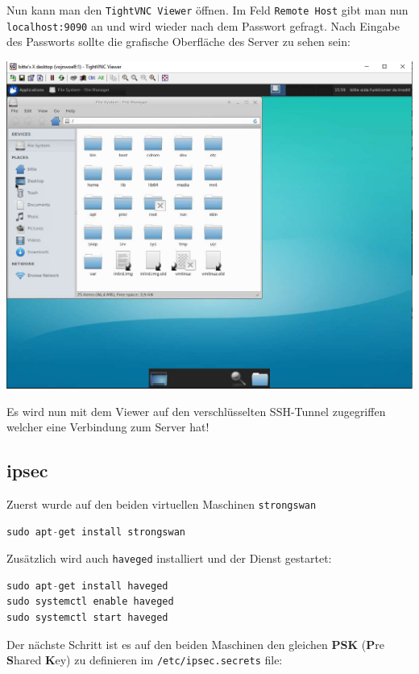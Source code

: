 Nun kann man den \verb|TightVNC Viewer| öffnen. Im Feld \verb|Remote Host| gibt man nun \verb|localhost:9090| an und wird wieder nach dem Passwort gefragt. Nach Eingabe des Passworts sollte die grafische Oberfläche des Server zu sehen sein:

\begin{minipage}{\linewidth}
	\centering
	\includegraphics[width=0.8\linewidth]{images/gui}
\end{minipage}

Es wird nun mit dem Viewer auf den verschlüsselten SSH-Tunnel zugegriffen welcher eine Verbindung zum Server hat!

\subsection{ipsec}
Zuerst wurde auf den beiden virtuellen Maschinen \verb|strongswan|

\begin{lstlisting}[language=Java]
sudo apt-get install strongswan
\end{lstlisting}

Zusätzlich wird auch \verb|haveged| installiert und der Dienst gestartet:

\begin{lstlisting}[language=Java]
sudo apt-get install haveged
sudo systemctl enable haveged
sudo systemctl start haveged
\end{lstlisting}

Der nächste Schritt ist es auf den beiden Maschinen den gleichen \textbf{PSK} (\textbf{P}re \textbf{S}hared \textbf{K}ey) zu definieren im \verb|/etc/ipsec.secrets| file:



